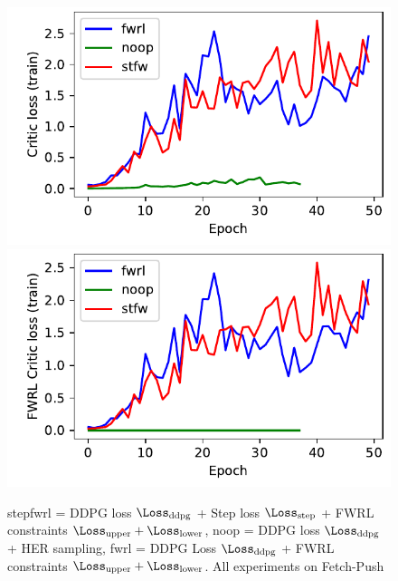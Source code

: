 \begin{figure}
  \includegraphics[width=\frac\columnwidth]{media/res/ea0e35b-FetchPush-v1-stfw-none/train/critic_loss.pdf}%
  \includegraphics[width=\frac\columnwidth]{media/res/ea0e35b-FetchPush-v1-stfw-none/train/critic_addnl_loss.pdf}%
  \caption{stepfwrl = DDPG loss $\Loss_{\text{ddpg}}$ + Step loss $\Loss_{\text{step}}$
    + FWRL constraints $\Loss_{\text{upper}} + \Loss_{\text{lower}}$, noop =
    DDPG loss $\Loss_{\text{ddpg}}$  + HER
    sampling, fwrl = DDPG Loss $\Loss_{\text{ddpg}}$ + FWRL constraints $\Loss_{\text{upper}} + \Loss_{\text{lower}}$.
    All experiments on Fetch-Push}
  \label{fig:loss-func-fetch-push}
\end{figure}
%

